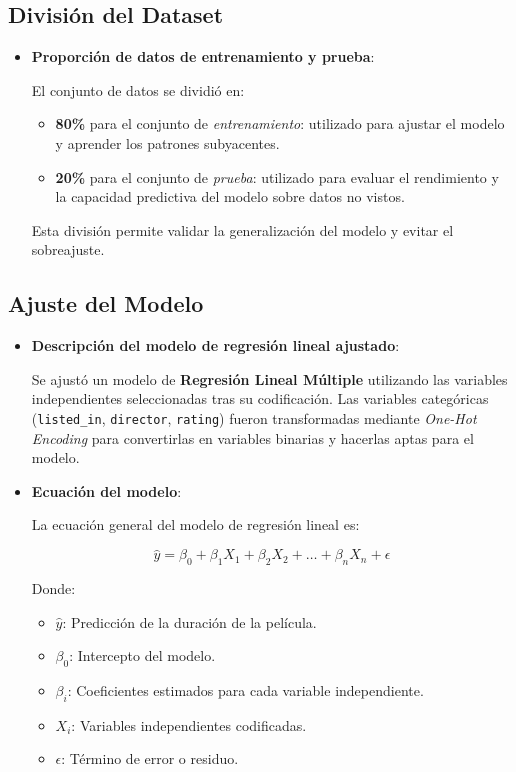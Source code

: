 \documentclass{article}
\begin{document}
\subsection{División del Dataset}
\begin{itemize}
    \item \textbf{Proporción de datos de entrenamiento y prueba}:

    El conjunto de datos se dividió en:
    \begin{itemize}
        \item \textbf{80\%} para el conjunto de \textit{entrenamiento}: utilizado para ajustar el modelo y aprender los patrones subyacentes.
        \item \textbf{20\%} para el conjunto de \textit{prueba}: utilizado para evaluar el rendimiento y la capacidad predictiva del modelo sobre datos no vistos.
    \end{itemize}
    Esta división permite validar la generalización del modelo y evitar el sobreajuste.
\end{itemize}

\subsection{Ajuste del Modelo}
\begin{itemize}
    \item \textbf{Descripción del modelo de regresión lineal ajustado}:

    Se ajustó un modelo de \textbf{Regresión Lineal Múltiple} utilizando las variables independientes seleccionadas tras su codificación. Las variables categóricas (\texttt{listed\_in}, \texttt{director}, \texttt{rating}) fueron transformadas mediante \textit{One-Hot Encoding} para convertirlas en variables binarias y hacerlas aptas para el modelo.

    \item \textbf{Ecuación del modelo}:

    La ecuación general del modelo de regresión lineal es:

    

\[
    \hat{y} = \beta_0 + \beta_1 X_1 + \beta_2 X_2 + \dots + \beta_n X_n + \epsilon
    \]



    Donde:
    \begin{itemize}
        \item \(\hat{y}\): Predicción de la duración de la película.
        \item \(\beta_0\): Intercepto del modelo.
        \item \(\beta_i\): Coeficientes estimados para cada variable independiente.
        \item \(X_i\): Variables independientes codificadas.
        \item \(\epsilon\): Término de error o residuo.
    \end{itemize}
\end{itemize}
\end{document}
